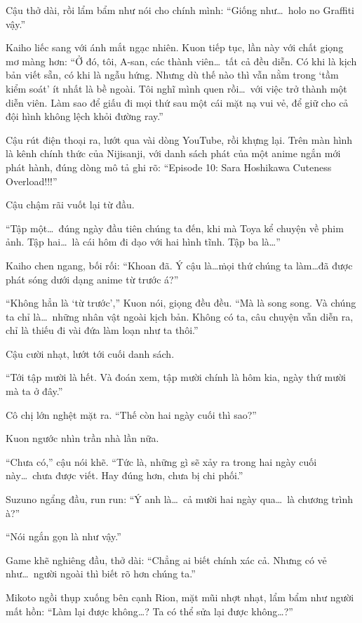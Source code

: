 \documentclass[../main.tex]{subfiles}
\begin{document}
Cậu thở dài, rồi lẩm bẩm như nói cho chính mình: ``Giống như\dots\ holo no Graffiti vậy.''

Kaiho liếc sang với ánh mắt ngạc nhiên. Kuon tiếp tục, lần này với chất giọng mơ màng hơn: ``Ở đó, tôi, A-san, các thành viên\dots\ tất cả đều diễn. Có khi là kịch bản viết sẵn, có khi là ngẫu hứng. Nhưng dù thế nào thì vẫn nằm trong `tầm kiểm soát' ít nhất là bề ngoài. Tôi nghĩ mình quen rồi\dots\ với việc trở thành một diễn viên. Làm sao để giấu đi mọi thứ sau một cái mặt nạ vui vẻ, để giữ cho cả đội hình không lệch khỏi đường ray.''

Cậu rút điện thoại ra, lướt qua vài dòng YouTube, rồi khựng lại. Trên màn hình là kênh chính thức của Nijisanji, với danh sách phát của một anime ngắn mới phát hành, đúng dòng mô tả ghi rõ: ``Episode 10: Sara Hoshikawa Cuteness Overload!!!''

Cậu chậm rãi vuốt lại từ đầu.

``Tập một\dots\ đúng ngày đầu tiên chúng ta đến, khi mà Toya kể chuyện về phim ảnh. Tập hai\dots\ là cái hôm đi dạo với hai hình tĩnh. Tập ba là\dots''

Kaiho chen ngang, bối rối: ``Khoan đã. Ý cậu là\dots\. mọi thứ chúng ta làm\dots đã được phát sóng dưới dạng anime từ trước á?''

``Không hẳn là `từ trước','' Kuon nói, giọng đều đều. ``Mà là song song. Và chúng ta chỉ là\dots\ những nhân vật ngoài kịch bản. Không có ta, câu chuyện vẫn diễn ra, chỉ là thiếu đi vài đứa làm loạn như ta thôi.''

Cậu cười nhạt, lướt tới cuối danh sách.

``Tới tập mười là hết. Và đoán xem, tập mười chính là hôm kia, ngày thứ mười mà ta ở đây.''

Cô chị lớn nghệt mặt ra. ``Thế còn hai ngày cuối thì sao?''

Kuon ngước nhìn trần nhà lần nữa.

``Chưa có,'' cậu nói khẽ. ``Tức là, những gì sẽ xảy ra trong hai ngày cuối này\dots\ chưa được viết. Hay đúng hơn, chưa bị chi phối.''

Suzuno ngẩng đầu, run run: ``Ý anh là\dots\ cả mười hai ngày qua\dots\ là chương trình à?''

``Nói ngắn gọn là như vậy.''

Game khẽ nghiêng đầu, thở dài: ``Chẳng ai biết chính xác cả. Nhưng có vẻ như\dots\ người ngoài thì biết rõ hơn chúng ta.''

Mikoto ngồi thụp xuống bên cạnh Rion, mặt mũi nhợt nhạt, lẩm bẩm như người mất hồn: ``Làm lại được không\dots? Ta có thể sửa lại được không\dots?''
\end{document}
